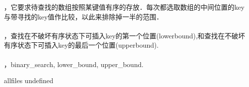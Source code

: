 \documentclass[a4paper,10pt]{article}
\begin{document}
\begin{CJK}{UTF8}{gbsn}     %

\else

	，它要求待查找的数组按照某键值有序的存放．每次都选取数组的中间位置的key与带寻找的key值作比较，以此来排除掉一半的范围．\\
\\
	，查找在不破坏有序状态下可插入key的第一个位置(lowerbound),和查找在不破坏有序状态下可插入key的最后一个位置(upperbound).\\
\\
	，binary\_search, lower\_bound, upper\_bound.\\


\fi

\ifx allfiles undefined
\end{CJK}
\end{document}
